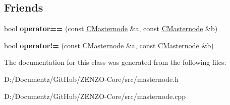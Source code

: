 \subsection*{Friends}
\begin{DoxyCompactItemize}
\item 
\mbox{\label{class_c_masternode_ac3549be50afdc1acd8be9a763cb7b355}} 
bool {\bfseries operator==} (const \mbox{\hyperlink{class_c_masternode}{C\+Masternode}} \&a, const \mbox{\hyperlink{class_c_masternode}{C\+Masternode}} \&b)
\item 
\mbox{\label{class_c_masternode_ab717eb8dbdf0438855bd30eb922fe73a}} 
bool {\bfseries operator!=} (const \mbox{\hyperlink{class_c_masternode}{C\+Masternode}} \&a, const \mbox{\hyperlink{class_c_masternode}{C\+Masternode}} \&b)
\end{DoxyCompactItemize}


The documentation for this class was generated from the following files\+:\begin{DoxyCompactItemize}
\item 
D\+:/\+Documentz/\+Git\+Hub/\+Z\+E\+N\+Z\+O-\/\+Core/src/masternode.\+h\item 
D\+:/\+Documentz/\+Git\+Hub/\+Z\+E\+N\+Z\+O-\/\+Core/src/masternode.\+cpp\end{DoxyCompactItemize}
